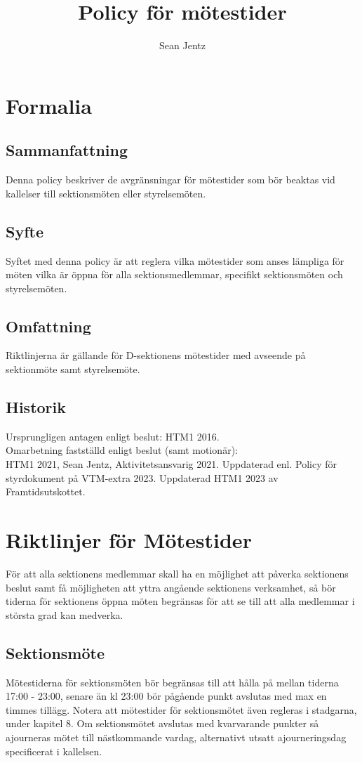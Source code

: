 \documentclass[]{dsekprotokoll}
\title{Policy för mötestider}
\author{Sean Jentz}
\begin{document}
\maketitle

\section{Formalia}

\subsection{Sammanfattning}
Denna policy beskriver de avgränsningar för mötestider som bör beaktas vid kallelser till sektionsmöten eller styrelsemöten.

\subsection{Syfte}
Syftet med denna policy är att reglera vilka mötestider som anses lämpliga för möten vilka är öppna för alla sektionsmedlemmar, specifikt sektionsmöten och styrelsemöten.

\subsection{Omfattning}
Riktlinjerna är gällande för D-sektionens mötestider med avseende på sektionmöte samt styrelsemöte.

\subsection{Historik}
Ursprungligen antagen enligt beslut: HTM1 2016. \\
Omarbetning fastställd enligt beslut (samt motionär): \\
HTM1 2021, Sean Jentz, Aktivitetsansvarig 2021.
Uppdaterad enl. Policy för styrdokument på VTM-extra 2023.
Uppdaterad HTM1 2023 av Framtidsutskottet.

\section{Riktlinjer för Mötestider}
För att alla sektionens medlemmar skall ha en möjlighet att påverka sektionens beslut samt få möjligheten att yttra angående sektionens verksamhet, så bör tiderna för sektionens öppna möten begränsas för att se till att alla medlemmar i största grad kan medverka.

\subsection{Sektionsmöte}
Mötestiderna för sektionsmöten bör begränsas till att hålla på mellan tiderna 17:00 -
23:00, senare än kl 23:00 bör pågående punkt avslutas med max en timmes tillägg.
Notera att mötestider för sektionsmötet även regleras i stadgarna, under kapitel 8. Om sektionsmötet avslutas med kvarvarande punkter så ajourneras mötet till nästkommande vardag, alternativt utsatt ajourneringsdag specificerat i kallelsen.
\end{document}

